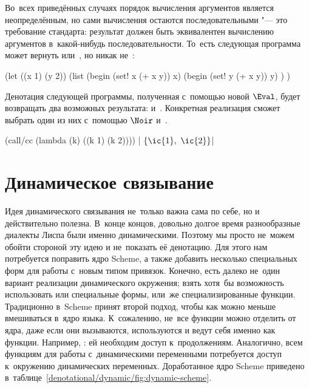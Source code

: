 Во~всех приведённых случаях порядок вычисления аргументов является
неопределённым, но сами вычисления остаются последовательными "--- это
требование стандарта: результат должен быть эквивалентен вычислению аргументов
в~какой-нибудь последовательности. То~есть следующая программа может вернуть
 или~, но никак не~:

\begin{code:lisp}
(let ((x 1) (y 2))
  (list (begin (set! x (+ x y)) x)
        (begin (set! y (+ x y)) y) ) )
\end{code:lisp}

Денотация следующей программы, полученная с~помощью новой $\Eval$, будет
возвращать два возможных результата:  и~. Конкретная реализация
сможет выбрать один из них с~помощью $\Noir$ и~\!.

\begin{code:lisp}
(call/cc (lambda (k) ((k 1) (k 2)))) |{\is} $\{\ic{1},\ \ic{2}\}$|
\end{code:lisp}


\section{Динамическое связывание}\label{denotational/sect:dynamic}

Идея динамического связывания не~только важна сама по себе, но и действительно
полезна. В~конце концов, довольно долгое время разнообразные диалекты Лиспа были
именно динамическими. Поэтому мы просто не~можем обойти стороной эту идею и
не~показать её денотацию. Для этого нам потребуется поправить ядро Scheme, а
также добавить несколько специальных форм для работы с~новым типом привязок.
Конечно, есть далеко не~один вариант реализации динамического окружения; взять
хотя~бы возможность использовать или специальные формы, или~же
специализированные функции.
 Традиционно
в~Scheme принят второй подход, чтобы как можно меньше вмешиваться в~ядро языка.
К~сожалению, не~все функции можно отделить от ядра, даже если они вызываются,
используются и ведут себя именно как функции. Например, : ей
необходим доступ к~продолжениям. Аналогично, всем функциям для работы
с~динамическими переменными потребуется доступ к~окружению динамических
переменных. Доработанное ядро Scheme приведено
в~таблице~\ref{denotational/dynamic/fig:dynamic-scheme}.

